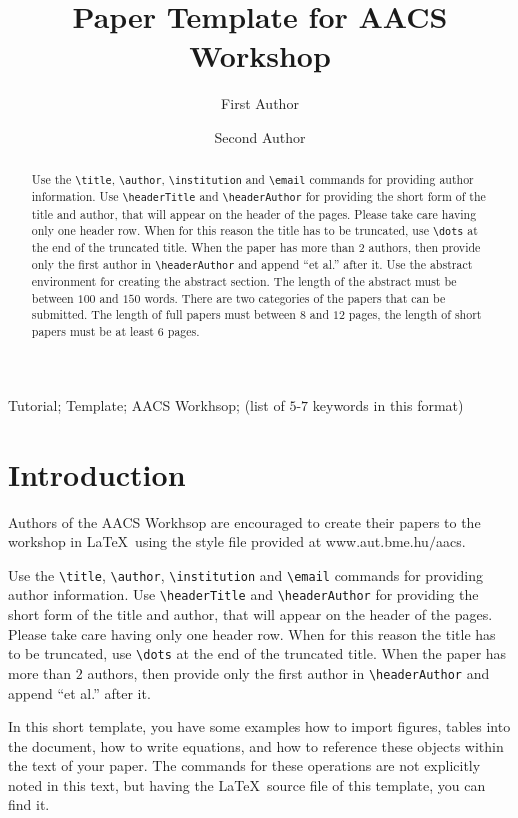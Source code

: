 \documentclass[twoside,b5paper,10pt]{article}
\title{Paper Template for AACS Workshop }
\author{First Author \and Second Author}
\begin{document}
\makeAutStyleTitle


\begin{abstract}
Use the \verb|\title|, \verb|\author|, \verb|\institution| and
\verb|\email| commands for providing author information.
Use \verb|\headerTitle| and \verb|\headerAuthor| for providing the short form of the title and author, that will appear on the header of the pages. Please take care having only one header row. When for this reason the title has to be truncated, use \verb|\dots| at the end of the truncated title. When the paper has more than $2$ authors, then provide only the first author in \verb|\headerAuthor| and append ``et al.'' after it.
Use the abstract environment for creating the abstract section. The length
of the abstract must be between $100$ and $150$ words. There are two
categories of the papers that can be submitted. The length of full
papers must between $8$ and $12$ pages, the length of short papers must
be at least $6$ pages.
\end{abstract}


\begin{keywords}
Tutorial; Template; AACS Workhsop; (list of $5$-$7$ keywords in this
format)
\end{keywords}

\section{Introduction}
\label{sec:Introdu}

Authors of the AACS Workhsop are encouraged to create their papers
to the workshop in \LaTeX \ using the style file provided at
www.aut.bme.hu$\slash$aacs.

Use the \verb|\title|, \verb|\author|, \verb|\institution| and
\verb|\email| commands for providing author information.
Use \verb|\headerTitle| and \verb|\headerAuthor| for providing the short form of the title and author, that will appear on the header of the pages. Please take care having only one header row. When for this reason the title has to be truncated, use \verb|\dots| at the end of the truncated title. When the paper has more than $2$ authors, then provide only the first author in \verb|\headerAuthor| and append ``et al.'' after it.

In this short template, you have some examples how to import
figures, tables into the document, how to write equations, and how
to reference these objects within the text of your paper. The
commands for these operations are not explicitly noted in this text,
but having the \LaTeX \ source file of this template, you can find
it.
\end{document}
